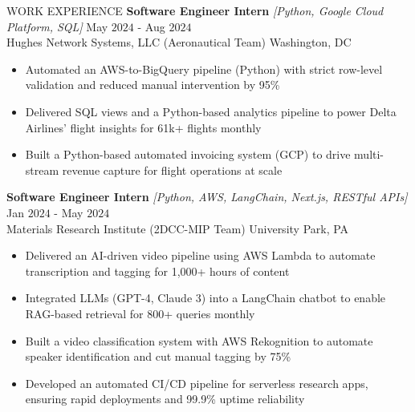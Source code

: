 \documentclass{resume} %
\begin{document}
\begin{rSection}{WORK EXPERIENCE}
{\bf Software Engineer Intern} \textit{[Python, Google Cloud Platform, SQL]} \hfill May $2024$ - Aug $2024$\\
Hughes Network Systems, LLC (Aeronautical Team) \hfill Washington, DC
\begin{itemize}[itemsep = -4pt]
    \item Automated an AWS-to-BigQuery pipeline (Python) with strict row-level validation and reduced manual intervention by 95\%
    \item Delivered SQL views and a Python-based analytics pipeline to power Delta Airlines’ flight insights for 61k+ flights monthly
    \item Built a Python-based automated invoicing system (GCP) to drive multi-stream revenue capture for flight operations at scale
\end{itemize}

{\bf Software Engineer Intern} \textit{[Python, AWS, LangChain, Next.js, RESTful APIs]} \hfill Jan $2024$ - May $2024$\\
Materials Research Institute (2DCC-MIP Team) \hfill University Park, PA
\begin{itemize}[itemsep = -4pt]
    \item Delivered an AI-driven video pipeline using AWS Lambda to automate transcription and tagging for 1,000+ hours of content
    \item Integrated LLMs (GPT-4, Claude 3) into a LangChain chatbot to enable RAG-based retrieval for 800+ queries monthly
    \item Built a video classification system with AWS Rekognition to automate speaker identification and cut manual tagging by 75\%
    \item Developed an automated CI/CD pipeline for serverless research apps, ensuring rapid deployments and 99.9\% uptime reliability
\end{itemize}


\end{rSection}
\end{document}
